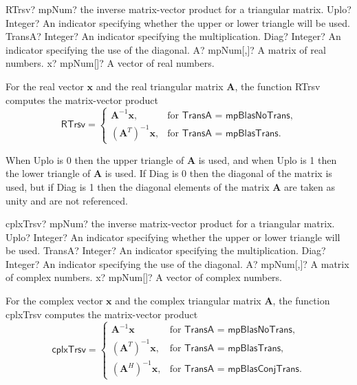 \begin{mpFunctionsExtract}
	\mpFunctionFive
	{RTrsv? mpNum?  the inverse matrix-vector product for a triangular matrix.}
	{Uplo? Integer? An indicator specifying whether the upper or lower triangle will be used.}
	{TransA? Integer? An indicator specifying the multiplication.}
	{Diag? Integer? An indicator specifying the use of the diagonal.}
	{A? mpNum[,]? A matrix of real numbers.}
	{x? mpNum[]? A vector of real numbers.}
\end{mpFunctionsExtract}

\vspace{0.3cm}
For the real vector $\boldsymbol{x}$ and the real triangular matrix $\boldsymbol{A}$, the function \textsf{RTrsv} computes the matrix-vector product
\begin{equation}
\textsf{RTrsv}=\begin{cases}
\boldsymbol{A}^{-1} \boldsymbol{x}, & \text{for } \textsf{TransA = mpBlasNoTrans},\\
\left(\boldsymbol{A}^T\right)^{-1} \boldsymbol{x}, & \text{for } \textsf{TransA = mpBlasTrans}.
\end{cases}
\end{equation}

When \textsf{Uplo} is 0 then the upper triangle of $\boldsymbol{A}$ is used, and when \textsf{Uplo} is 1 then the lower triangle of $\boldsymbol{A}$ is used. If \textsf{Diag} is 0 then the diagonal of the matrix is used, but if \textsf{Diag} is 1 then the diagonal elements of the matrix $\boldsymbol{A}$ are taken as unity and are not referenced. 


\vspace{0.6cm}
\begin{mpFunctionsExtract}
	\mpFunctionFive
	{cplxTrsv? mpNum?  the inverse matrix-vector product for a triangular matrix.}
	{Uplo? Integer? An indicator specifying whether the upper or lower triangle will be used.}
	{TransA? Integer? An indicator specifying the multiplication.}
	{Diag? Integer? An indicator specifying the use of the diagonal.}
	{A? mpNum[,]? A matrix of complex numbers.}
	{x? mpNum[]? A vector of complex numbers.}
\end{mpFunctionsExtract}
\vspace{0.3cm}
For the complex vector $\boldsymbol{x}$ and the complex triangular matrix $\boldsymbol{A}$, the function \textsf{cplxTrsv} computes the matrix-vector product
\begin{equation}
\textsf{cplxTrsv}=\begin{cases}
\boldsymbol{A}^{-1} \boldsymbol{x} & \text{for } \textsf{TransA = mpBlasNoTrans},\\
\left(\boldsymbol{A}^T\right)^{-1} \boldsymbol{x}, & \text{for } \textsf{TransA = mpBlasTrans},\\
\left(\boldsymbol{A}^H\right)^{-1} \boldsymbol{x}, & \text{for } \textsf{TransA = mpBlasConjTrans}.
\end{cases}
\end{equation}

